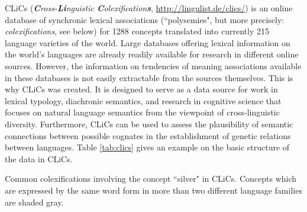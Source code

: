 CLiCs (\emph{\textbf{C}ross-\textbf{Li}nguistic \textbf{C}olexification\textbf{s}},
\url{http://lingulist.de/clics/}) is an online
database of synchronic lexical associations (``polysemies", but more precisely:
\emph{colexifications}, see below) for 1288 concepts translated into currently 215 language varieties of the world. 
Large databases offering lexical
information on the world’s languages are already readily available for research in different online
sources. However, the information on tendencies of meaning associations available in these databases
is not easily extractable from the sources themselves. This is why CLiCs was created.  
It is designed
to serve as a data source for work in lexical typology, diachronic semantics, and research in
cognitive science that focuses on natural language semantics from the viewpoint of cross-linguistic
diversity. Furthermore, CLiCs can be used to assess the plausibility of semantic
connections between possible cognates in the establishment of genetic relations between languages.
Table \ref{tab:clics} gives an example on the basic structure of the data in CLiCs. 
 
\begin{table}[b]
    \centering
{}
\caption{Common colexifications involving the concept ``silver" in CLiCs. Concepts which are
expressed by the same word form in more than two different language families are shaded gray.}
\label{tab:clics}
\end{table}


